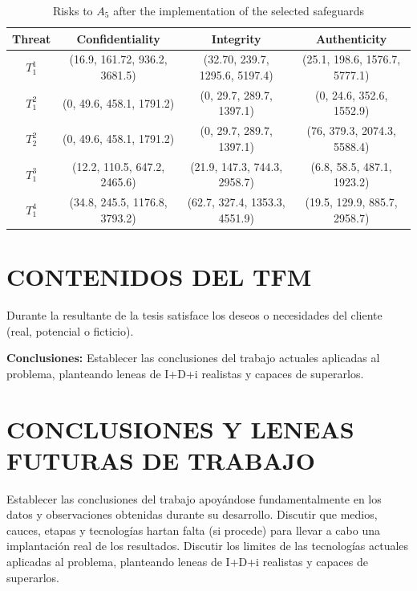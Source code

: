 {{		\begin{table}[htb]
			\centering
			\caption{Risks to $A_5$ after the implementation of the selected safeguards }
			\label{table:risk}
			\begin{tabular}{cccc}
				\hline
				\noalign{\smallskip} 
				{\scriptsize{Threat}}& {\scriptsize{Confidentiality}} & {\scriptsize{Integrity}} & {\scriptsize{Authenticity}}\tabularnewline
				\hline  
				{\scriptsize{$T_{1}^{1}$}} & \scriptsize{(16.9, 161.72, 936.2, 3681.5)} & \scriptsize{(32.70, 239.7, 1295.6, 5197.4)} & \scriptsize{(25.1, 198.6, 1576.7, 5777.1)}\\
				{\scriptsize{$T_{1}^{2}$}} & \scriptsize{(0, 49.6, 458.1, 1791.2)} & \scriptsize{(0, 29.7, 289.7, 1397.1)} & \scriptsize{(0, 24.6, 352.6, 1552.9)}\\
				{\scriptsize{$T_{2}^{2}$}} & \scriptsize{(0, 49.6, 458.1, 1791.2)} & \scriptsize{(0, 29.7, 289.7, 1397.1)} & \scriptsize{(76, 379.3, 2074.3, 5588.4)}\\
				{\scriptsize{$T_{1}^{3}$}} & \scriptsize{(12.2, 110.5, 647.2, 2465.6)} & \scriptsize{(21.9, 147.3, 744.3, 2958.7)} & \scriptsize{(6.8, 58.5, 487.1, 1923.2)}\\ 
				{\scriptsize{$T_{1}^{4}$}} & \scriptsize{(34.8, 245.5, 1176.8, 3793.2)} & \scriptsize{(62.7, 327.4, 1353.3, 4551.9)} & \scriptsize{(19.5, 129.9, 885.7, 2958.7)}\\
				\hline 
			\end{tabular}
		\end{table}
		
		
		\section{CONTENIDOS DEL TFM}
		Durante la resultante de la tesis satisface los deseos o necesidades del cliente (real, potencial o ficticio).
		
		{\bf Conclusiones:}
		Establecer las conclusiones del trabajo  actuales aplicadas al problema, planteando leneas de I+D+i realistas y capaces de superarlos.
		
		\section{CONCLUSIONES Y LENEAS FUTURAS DE TRABAJO}
		Establecer las conclusiones del trabajo apoyándose fundamentalmente en los datos y observaciones obtenidas durante su desarrollo. Discutir que medios, cauces, etapas y tecnologías hartan falta (si procede) para llevar a cabo una implantación real de los resultados.
		Discutir los limites de las tecnologías actuales aplicadas al problema, planteando leneas de I+D+i realistas y capaces de superarlos.
		
}}

